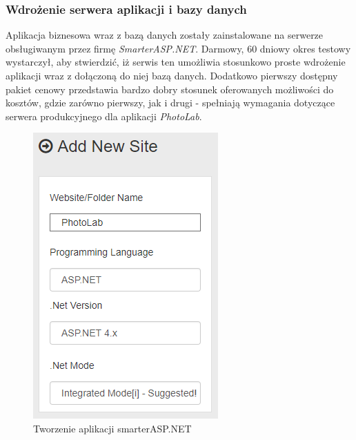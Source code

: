 \vspace*{0.01\baselineskip}

\subsubsection{Wdrożenie serwera aplikacji i bazy danych}
\quad Aplikacja biznesowa wraz z bazą danych zostały zainstalowane na serwerze obsługiwanym przez firmę \textit{SmarterASP.NET}. Darmowy, 60 dniowy okres testowy wystarczył, aby stwierdzić, iż serwis ten umożliwia stosunkowo proste wdrożenie aplikacji wraz z dołączoną do niej bazą danych. Dodatkowo pierwszy dostępny pakiet cenowy przedstawia bardzo dobry stosunek oferowanych możliwości do kosztów, gdzie zarówno pierwszy, jak i drugi - spełniają wymagania dotyczące serwera produkcyjnego dla aplikacji \textit{PhotoLab}.
        \begin{figure}
        \includegraphics[width=1\linewidth]{graphics/chapter-4/server-account.png}
        \caption{Tworzenie aplikacji smarterASP.NET}
        \label{fig:server-application}
        \end{figure}
        
